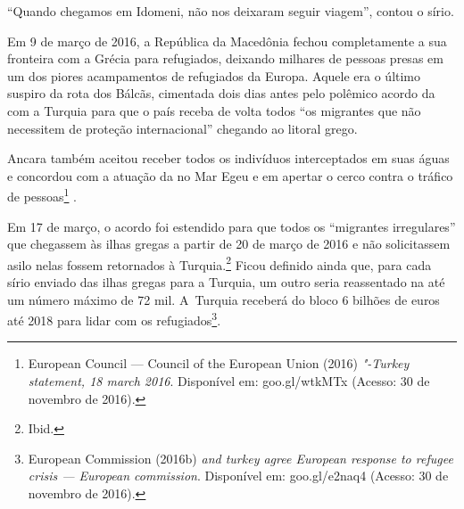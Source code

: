 ``Quando chegamos em Idomeni, não nos deixaram seguir viagem'', contou
o sírio.

 Em 9 de março de 2016, a República da Macedônia fechou completamente a sua
fronteira com a Grécia para refugiados, deixando milhares de
pessoas presas em um dos piores acampamentos de refugiados da Europa.
Aquele era o último suspiro da rota dos Bálcãs, cimentada dois dias
antes pelo polêmico acordo da  com a Turquia para que o país receba de volta todos ``os migrantes que não necessitem de proteção
internacional'' chegando ao litoral grego.
% 
% 
% 
%
%

Ancara também aceitou receber todos os indivíduos interceptados em suas águas e concordou com a
atuação da  no Mar Egeu e em apertar o cerco contra o tráfico de
pessoas\footnote{ European Council --- Council of the European Union
(2016) \emph{"-Turkey statement, 18 march 2016}. Disponível em:
goo.gl/wtkMTx
(Acesso: 30 de novembro de 2016).} .

% 
% 
Em 17 de março, o acordo foi estendido para que todos os ``migrantes
irregulares'' que chegassem às ilhas gregas a partir de 20 de março de
2016 e não solicitassem asilo nelas fossem retornados à
Turquia.\footnote{ Ibid.}  Ficou definido ainda que, para cada sírio
enviado das ilhas gregas para a Turquia, um outro seria reassentado na
 até um número máximo de 72 mil. A~Turquia receberá do bloco 6 bilhões
de euros até 2018 para lidar com os refugiados\footnote{ European Commission (2016b) \emph{ and turkey agree
European response to refugee crisis --- European commission}. Disponível
em: goo.gl/e2naq4
(Acesso: 30 de
novembro de 2016).}.

